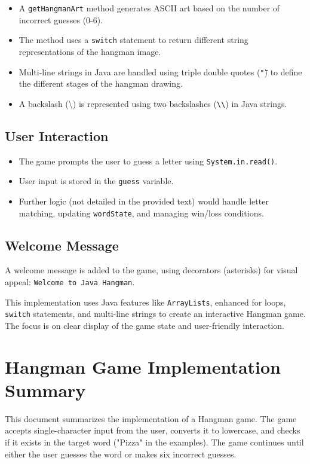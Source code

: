 \documentclass{article}
\begin{document}
\begin{itemize}
\begin{itemize}
    \item A \texttt{getHangmanArt} method generates ASCII art based on the number of incorrect guesses (0-6).
    \item The method uses a \texttt{switch} statement to return different string representations of the hangman image.
    \item Multi-line strings in Java are handled using triple double quotes (\texttt{"\"\"\"}) to define the different stages of the hangman drawing.
    \item  A backslash (\textbackslash{}) is represented using two backslashes (\texttt{\textbackslash{}\textbackslash{}}) in Java strings.
\end{itemize}

\subsection{User Interaction}

\begin{itemize}
    \item The game prompts the user to guess a letter using \texttt{System.in.read()}.
    \item User input is stored in the \texttt{guess} variable.
    \item  Further logic (not detailed in the provided text) would handle letter matching, updating \texttt{wordState}, and managing win/loss conditions.
\end{itemize}

\subsection{Welcome Message}

A welcome message is added to the game, using decorators (asterisks) for visual appeal:  \texttt{Welcome to Java Hangman}.


This implementation uses Java features like \texttt{ArrayLists}, enhanced for loops, \texttt{switch} statements, and multi-line strings to create an interactive Hangman game.  The focus is on clear display of the game state and user-friendly interaction.


\section*{Hangman Game Implementation Summary}

This document summarizes the implementation of a Hangman game.  The game accepts single-character input from the user, converts it to lowercase, and checks if it exists in the target word ("Pizza" in the examples).  The game continues until either the user guesses the word or makes six incorrect guesses.


\end{itemize}
\end{document}
